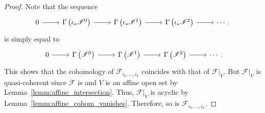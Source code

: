 \begin{proof}
  Note that the sequence
  \[\begin{tikzcd}
    0\rar & \Gamma\left(\iota_{\ast}\mathscr{I}^{0}\right)\rar
    & \Gamma\left(\iota_{\ast}\mathscr{I}^{1}\right)\rar
    & \Gamma\left(\iota_{\ast}\mathscr{I}^{2}\right)\rar & \cdots.
    \end{tikzcd}\]
  is simply equal to
  \[\begin{tikzcd}
      0\rar & \Gamma\left(\mathscr{I}^{0}\right)\rar
      & \Gamma\left(\mathscr{I}^{1}\right)\rar
      & \Gamma\left(\mathscr{I}^{2}\right)\rar & \cdots
    \end{tikzcd}.\]
  This shows that the cohomology of $\mathscr{F}_{i_{0},\ldots,i_{k}}$
  coincides with that of $\mathscr{F}\vert_{V}$. But $\mathscr{F}\vert_{V}$ is
  quasi-coherent since $\mathscr{F}$ is and $V$ is an affine open set
  by Lemma~\ref{lemm:affine_intersection}. Thus, $\mathscr{F}\vert_{V}$
  is acyclic by Lemma~\ref{lemm:affine_cohom_vanishes}.
  Therefore, so is $\mathscr{F}_{i_{0},\ldots,i_{k}}$.
\end{proof}

